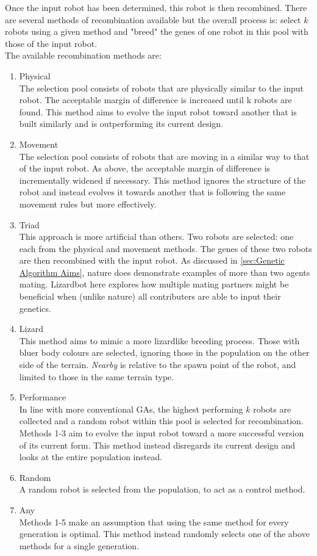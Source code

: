 \documentclass{article}
\begin{document}
Once the input robot has been determined, this robot is then recombined. There are several methods of recombination available but the overall process is: select $k$ robots using a given method and "breed" the genes of one robot in this pool with those of the input robot.\\
The available recombination methods are:
\begin{enumerate}
  \item Physical\\
The selection pool consists of robots that are physically similar to the input robot. The acceptable margin of difference is increased until k robots are found. This method aims to evolve the input robot toward another that is built similarly and is outperforming its current design.
  \item Movement\\
The selection pool consists of robots that are moving in a similar way to that of the input robot. As above, the acceptable margin of difference is incrementally widened if necessary. This method ignores the structure of the robot and instead evolves it towards another that is following the same movement rules but more effectively.
	\item Triad\\
This approach is more artificial than others. Two robots are selected: one each from the physical and movement methods. The genes of these two robots are then recombined with the input robot. As discussed in \ref{sec:Genetic Algorithm Aims}, nature does demonstrate examples of more than two agents mating. Lizardbot here explores how multiple mating partners might be beneficial when (unlike nature) all contributers are able to input their genetics.
	\item Lizard\\
This method aims to mimic a more lizardlike breeding process. Those with bluer body colours are selected, ignoring those in the population on the other side of the terrain. \textit{Nearby} is relative to the spawn point of the robot, and limited to those in the same terrain type. 
	\item Performance\\
In line with more conventional GAs, the highest performing $k$ robots are collected and a random robot within this pool is selected for recombination. Methods 1-3 aim to evolve the input robot toward a more successful version of its current form. This method instead disregards its current design and looks at the entire population instead.
	\item Random\\
A random robot is selected from the population, to act as a control method.
	\item Any\\
Methods 1-5 make an assumption that using the same method for every generation is optimal. This method instead randomly selects one of the above methods for a single generation.
\end{enumerate}
\end{document}
